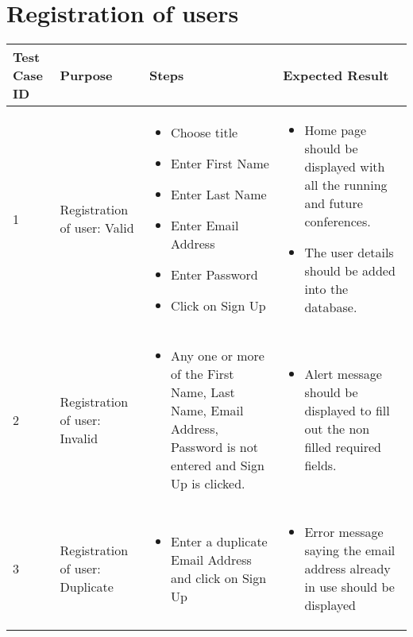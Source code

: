 \documentclass[english,a4paper,12pt]{report}
\begin{document}
\section{Registration of users}
\begin{longtable} { | p{2cm} | p{3cm}| p{6cm}| p{6cm} |} 
\hline 
\textbf{Test Case ID} & \textbf{Purpose}  & \textbf{Steps} &\textbf{Expected Result} \\
\hline 1 &  Registration of user: Valid & 
\vspace{-5mm}
\begin{itemize}
\item Choose title 
\item Enter First Name 
\item Enter Last Name
\item Enter Email Address 
\item Enter Password 
\item Click on Sign Up
\end{itemize}
&
\vspace{-5mm}
\begin{itemize} 
\item Home page should be displayed with all the running and future conferences.
\item The user details should be added into the database.
\end{itemize}\\
\hline 2 &  Registration of user: Invalid &  
\vspace{-5mm}
\begin{itemize}
\item Any one or more of the First Name, Last Name, Email Address, Password is not entered and Sign Up is clicked.
\end{itemize}
&
\vspace{-5mm}
\begin{itemize}
    \item Alert message should be displayed to fill out the non filled required fields.
\end{itemize}\\
\hline 3 &  Registration of user: Duplicate & 
\vspace{-5mm}
\begin{itemize}
    \item Enter a duplicate Email Address and click on Sign Up
\end{itemize}  & 
\vspace{-5mm}
\begin{itemize}
    \item Error message saying the email address already in use should be displayed 

\end{itemize}
\end{longtable}
\end{document}
